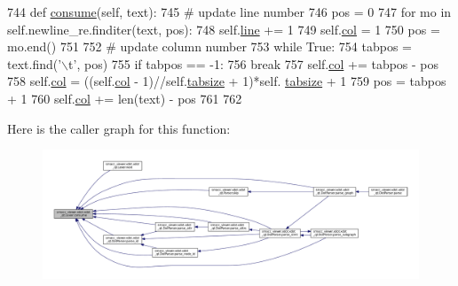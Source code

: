\begin{DoxyCode}
744     \textcolor{keyword}{def }\hyperlink{classsmacc__viewer_1_1xdot_1_1xdot__qt_1_1Lexer_a8cf96c4dfb5bc99dce408ffe5669ec4b}{consume}(self, text):
745         \textcolor{comment}{# update line number}
746         pos = 0
747         \textcolor{keywordflow}{for} mo \textcolor{keywordflow}{in} self.newline\_re.finditer(text, pos):
748             self.\hyperlink{classsmacc__viewer_1_1xdot_1_1xdot__qt_1_1Lexer_a52906deed94ab0734201e50faf6f3c7f}{line} += 1
749             self.\hyperlink{classsmacc__viewer_1_1xdot_1_1xdot__qt_1_1Lexer_af2614106d71cab740cc0e1e1e6e349c0}{col} = 1
750             pos = mo.end()
751 
752         \textcolor{comment}{# update column number}
753         \textcolor{keywordflow}{while} \textcolor{keyword}{True}:
754             tabpos = text.find(\textcolor{stringliteral}{'\(\backslash\)t'}, pos)
755             \textcolor{keywordflow}{if} tabpos == -1:
756                 \textcolor{keywordflow}{break}
757             self.\hyperlink{classsmacc__viewer_1_1xdot_1_1xdot__qt_1_1Lexer_af2614106d71cab740cc0e1e1e6e349c0}{col} += tabpos - pos
758             self.\hyperlink{classsmacc__viewer_1_1xdot_1_1xdot__qt_1_1Lexer_af2614106d71cab740cc0e1e1e6e349c0}{col} = ((self.\hyperlink{classsmacc__viewer_1_1xdot_1_1xdot__qt_1_1Lexer_af2614106d71cab740cc0e1e1e6e349c0}{col} - 1)//self.\hyperlink{classsmacc__viewer_1_1xdot_1_1xdot__qt_1_1Lexer_a512bd6b3cb3ddefd1776ef45e247ea4b}{tabsize} + 1)*self.
      \hyperlink{classsmacc__viewer_1_1xdot_1_1xdot__qt_1_1Lexer_a512bd6b3cb3ddefd1776ef45e247ea4b}{tabsize} + 1
759             pos = tabpos + 1
760         self.\hyperlink{classsmacc__viewer_1_1xdot_1_1xdot__qt_1_1Lexer_af2614106d71cab740cc0e1e1e6e349c0}{col} += len(text) - pos
761 
762 
\end{DoxyCode}


Here is the caller graph for this function\+:
\nopagebreak
\begin{figure}[H]
\begin{center}
\leavevmode
\includegraphics[width=350pt]{classsmacc__viewer_1_1xdot_1_1xdot__qt_1_1Lexer_a8cf96c4dfb5bc99dce408ffe5669ec4b_icgraph}
\end{center}
\end{figure}


